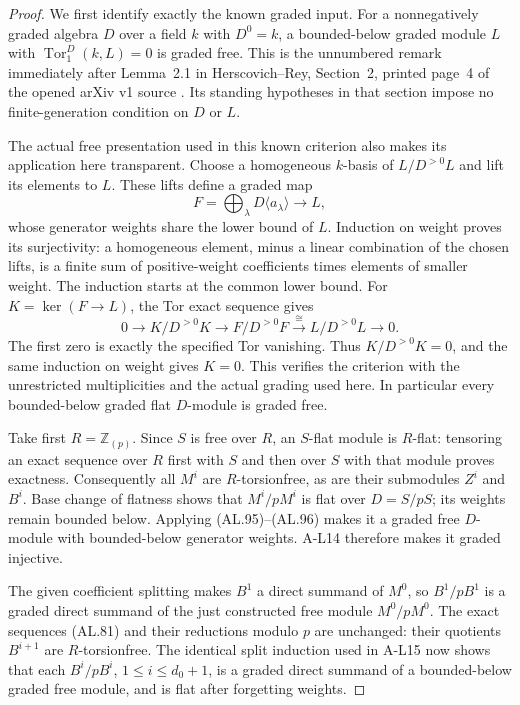 \begin{proof}
We first identify exactly the known graded input.
For a nonnegatively graded algebra $D$ over a field
$k$ with $D^0=k$, a bounded-below graded module $L$
with $\operatorname{Tor}^D_1(k,L)=0$ is graded free.
This is the unnumbered remark immediately after
Lemma~2.1 in Herscovich--Rey, Section~2, printed
page~4 of the opened arXiv v1 source
\cite{B-Herscovich-Rey-2012}. Its standing hypotheses
in that section impose no finite-generation condition
on $D$ or $L$.

The actual free presentation used in this known
criterion also makes its application here transparent.
Choose a homogeneous $k$-basis of $L/D^{>0}L$ and
lift its elements to $L$. These lifts define a graded
map
\[
 F=\bigoplus_\lambda D\langle a_\lambda\rangle
                     \longrightarrow L,
 \tag{AL.95}
\]
whose generator weights share the lower bound of $L$.
Induction on weight proves its surjectivity: a
homogeneous element, minus a linear combination of
the chosen lifts, is a finite sum of positive-weight
coefficients times elements of smaller weight.
The induction starts at the common lower bound.
For $K=\ker(F\to L)$, the Tor exact sequence gives
\[
 0\longrightarrow K/D^{>0}K\longrightarrow
 F/D^{>0}F\xrightarrow{\cong}L/D^{>0}L
 \longrightarrow0.
 \tag{AL.96}
\]
The first zero is exactly the specified Tor vanishing.
Thus $K/D^{>0}K=0$, and the same induction on weight
gives $K=0$. This verifies the criterion with the
unrestricted multiplicities and the actual grading
used here. In particular every bounded-below graded
flat $D$-module is graded free.

Take first $R=\mathbb Z_{(p)}$. Since $S$ is free
over $R$, an $S$-flat module is $R$-flat: tensoring
an exact sequence over $R$ first with $S$ and then
over $S$ with that module proves exactness. Consequently
all $M^i$ are $R$-torsionfree, as are their submodules
$Z^i$ and $B^i$. Base change of flatness shows that
$M^i/pM^i$ is flat over $D=S/pS$; its weights remain
bounded below. Applying (AL.95)--(AL.96) makes it a
graded free $D$-module with bounded-below generator
weights. A-L14 therefore makes it graded injective.

The given coefficient splitting makes $B^1$ a
direct summand of $M^0$, so $B^1/pB^1$ is a graded
direct summand of the just constructed free module
$M^0/pM^0$. The exact sequences (AL.81) and their
reductions modulo $p$ are unchanged: their quotients
$B^{i+1}$ are $R$-torsionfree. The identical split
induction used in A-L15 now shows that each
$B^i/pB^i$, $1\leq i\leq d_0+1$, is a graded
direct summand of a bounded-below graded free module,
and is flat after forgetting weights.


\end{proof}
